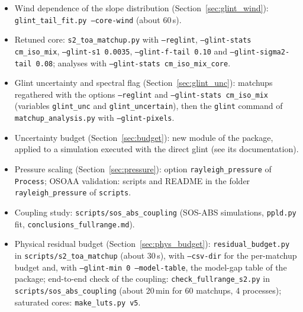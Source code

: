 \documentclass[11pt,a4paper]{article}
\newcommand{\code}[1]{\texttt{#1}}
\begin{document}
\begin{itemize}
  decomposition: \code{aot\_term\_search.py} with \code{--glint-stats cm\_iso\_mix --with-glint} and
  \code{--flags-exclude glint\_high glint\_near\_specular}.
\item Wind dependence of the slope distribution (Section~\ref{sec:glint_wind}): \code{glint\_tail\_fit.py --core-wind}
  (about 60\,s).
\item Retuned core: \code{s2\_toa\_matchup.py} with \code{--reglint}, \code{--glint-stats cm\_iso\_mix},
  \code{--glint-s1 0.0035}, \code{--glint-f-tail 0.10} and \code{--glint-sigma2-tail 0.08}; analyses with
  \code{--glint-stats cm\_iso\_mix\_core}.
\item Glint uncertainty and spectral flag (Section~\ref{sec:glint_unc}): matchups regathered with the options
  \code{--reglint} and \code{--glint-stats cm\_iso\_mix} (variables \code{glint\_unc} and \code{glint\_uncertain}),
  then the \code{glint} command of \code{matchup\_analysis.py} with \code{--glint-pixels}.
\item Uncertainty budget (Section~\ref{sec:budget}): new module of the package, applied to a simulation
  executed with the direct glint (see its documentation).
\item Pressure scaling (Section~\ref{sec:pressure}): option \code{rayleigh\_pressure} of \code{Process}; OSOAA
  validation: scripts and README in the folder \code{rayleigh\_pressure} of \code{scripts}.
\item Coupling study: \code{scripts/sos\_abs\_coupling} (SOS-ABS simulations, \code{ppld.py} fit,
  \code{conclusions\_fullrange.md}).
\item Physical residual budget (Section~\ref{sec:phys_budget}): \code{residual\_budget.py} in
  \code{scripts/s2\_toa\_matchup} (about 30\,s), with \code{--csv-dir} for the per-matchup budget and, with
  \code{--glint-min 0 --model-table}, the model-gap table of the package; end-to-end check of the coupling:
  \code{check\_fullrange\_s2.py} in \code{scripts/sos\_abs\_coupling} (about 20\,min for 60 matchups, 4 processes);
  saturated cores: \code{make\_luts.py v5}.
\end{itemize}
\end{document}
